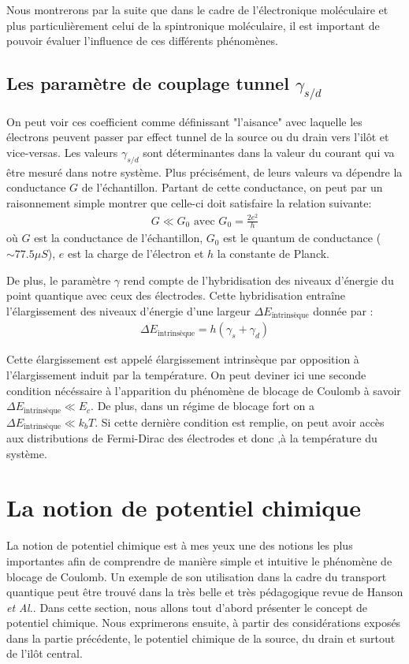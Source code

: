 Nous montrerons par la suite que dans le cadre de l'électronique moléculaire et plus particulièrement celui de la spintronique moléculaire, il est important de pouvoir évaluer l'influence de ces différents phénomènes.

\subsection{Les paramètre de couplage tunnel $\gamma_{s/d}$}
On peut voir ces coefficient comme définissant "l'aisance" avec laquelle les électrons peuvent passer par effect tunnel de la source ou du drain vers l'il\^ot et vice-versas. Les valeurs $\gamma_{s/d}$ sont déterminantes dans la valeur du courant qui va \^etre mesuré dans notre système. Plus précisément, de leurs valeurs va dépendre la conductance $G$ de l'échantillon. Partant de cette conductance, on peut par un raisonnement simple montrer que celle-ci doit satisfaire la relation suivante:
\begin{eqnarray}
G \ll G_0 \text{ avec } G_0 = \frac{2e^2}{h}
\end{eqnarray}
où $G$ est la conductance de l'échantillon, $G_0$ est le quantum de conductance ($\sim 77.5 \mu S$), $e$ est la charge de l'électron et $h$ la constante de Planck.


De plus, le paramètre $\gamma$ rend compte de l'hybridisation des niveaux d'énergie du point quantique avec ceux des électrodes. Cette hybridisation entraîne l'élargissement des niveaux d'énergie d'une largeur $\Delta E_{\text{intrinsèque}}$ donnée par :
\begin{eqnarray}
\Delta E_{\text{intrinsèque}} = h (\gamma_s + \gamma_d)
\end{eqnarray}

Cette élargissement est appelé élargissement intrinsèque par opposition à l'élargissement induit par la température. On peut deviner ici une seconde condition nécéssaire à l'apparition du phénomène de blocage de Coulomb à savoir $\Delta E_{\text{intrinsèque}} \ll E_c$. De plus, dans un régime de blocage fort on a $\Delta E_{\text{intrinsèque}} \ll k_bT$. Si cette dernière condition est remplie, on peut avoir accès aux distributions de Fermi-Dirac des électrodes et donc ,à la température du système.




\section{La notion de potentiel chimique}
La notion de potentiel chimique est à mes yeux une des notions les plus importantes afin de comprendre de manière simple et intuitive le phénomène de blocage de Coulomb. Un exemple de son utilisation dans la cadre du transport quantique peut \^etre trouvé dans la très belle et très pédagogique revue de Hanson \textit{et Al.}. Dans cette section, nous allons tout d'abord présenter le concept de potentiel chimique. Nous exprimerons ensuite, à partir des considérations exposés dans la partie précédente, le potentiel chimique de la source, du drain et surtout de l'ilôt central.

